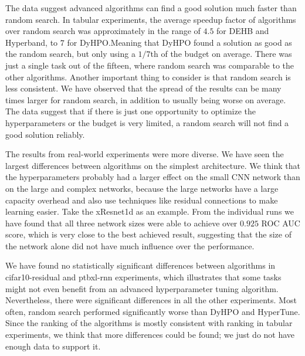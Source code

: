 The data suggest advanced algorithms can find a good solution much faster than random search. In tabular experiments, the average speedup factor of algorithms over random search was approximately in the range of $4.5$ for DEHB and Hyperband, to $7$ for DyHPO.\@ Meaning that DyHPO found a solution as good as the random search, but only using a $1/7$th of the budget on average. There was just a single task out of the fifteen, where random search was comparable to the other algorithms. Another important thing to consider is that random search is less consistent. We have observed that the spread of the results can be many times larger for random search, in addition to usually being worse on average. The data suggest that if there is just one opportunity to optimize the hyperparameters or the budget is very limited, a random search will not find a good solution reliably.

The results from real-world experiments were more diverse. We have seen the largest differences between algorithms on the simplest architecture. We think that the hyperparameters probably had a larger effect on the small CNN network than on the large and complex networks, because the large networks have a large capacity overhead and also use techniques like residual connections to make learning easier. Take the xResnet1d as an example. From the individual runs we have found that all three network sizes were able to achieve over $0.925$ ROC AUC score, which is very close to the best achieved result, suggesting that the size of the network alone did not have much influence over the performance.

We have found no statistically significant differences between algorithms in cifar10-residual and ptbxl-rnn experiments, which illustrates that some tasks might not even benefit from an advanced hyperparameter tuning algorithm. Nevertheless, there were significant differences in all the other experiments. Most often, random search performed significantly worse than DyHPO and HyperTune. Since the ranking of the algorithms is mostly consistent with ranking in tabular experiments, we think that more differences could be found; we just do not have enough data to support it.






